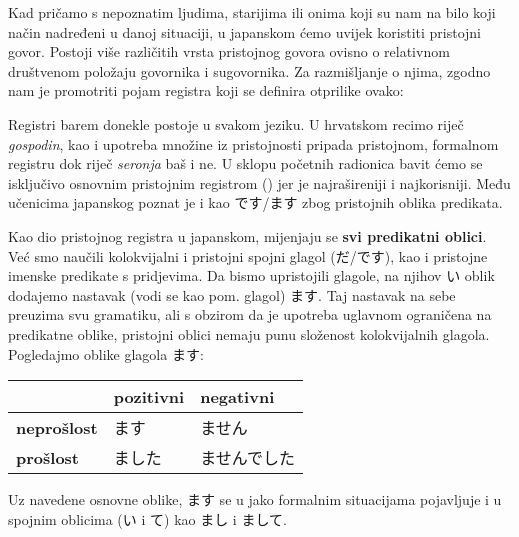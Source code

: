 	
	Kad pričamo s nepoznatim ljudima, starijima ili onima koji su nam na bilo koji način nadređeni u danoj situaciji, u japanskom ćemo uvijek koristiti pristojni govor. Postoji više različitih vrsta pristojnog govora ovisno o relativnom društvenom položaju govornika i sugovornika. Za razmišljanje o njima, zgodno nam je promotriti pojam registra koji se definira otprilike ovako:
	
	
	Registri barem donekle postoje u svakom jeziku. U hrvatskom recimo riječ \textit{gospodin}, kao i upotreba množine iz pristojnosti pripada pristojnom, formalnom registru dok riječ \textit{seronja} baš i ne. U sklopu početnih radionica bavit ćemo se isključivo osnovnim pristojnim registrom () jer je najrašireniji i najkorisniji. Među učenicima japanskog poznat je i kao です/ます zbog pristojnih oblika predikata.
	
	\newpage
	
	Kao dio pristojnog registra u japanskom, mijenjaju se \textbf{svi predikatni oblici}\footnotemark[1]. Već smo naučili kolokvijalni i pristojni spojni glagol (だ/です), kao i pristojne imenske predikate s pridjevima. Da bismo upristojili glagole, na njihov い oblik dodajemo nastavak (vodi se kao pom. glagol) ます. Taj nastavak na sebe preuzima svu gramatiku, ali s obzirom da je upotreba uglavnom ograničena na predikatne oblike, pristojni oblici nemaju punu složenost kolokvijalnih glagola. Pogledajmo oblike glagola ます:
	
	\vspace{10pt}
	\begin{tabular}{|l|l|l|}
		\hline
		&\textbf{pozitivni}&\textbf{negativni}\\
		\hline
		\textbf{neprošlost}&ます&ません\\
		\hline
		\textbf{prošlost}&ました&ませんでした\\
		\hline
	\end{tabular}

	\vspace{10pt}
	Uz navedene osnovne oblike, ます se u jako formalnim situacijama pojavljuje i u spojnim oblicima (い i て) kao まし i まして.
	
	
